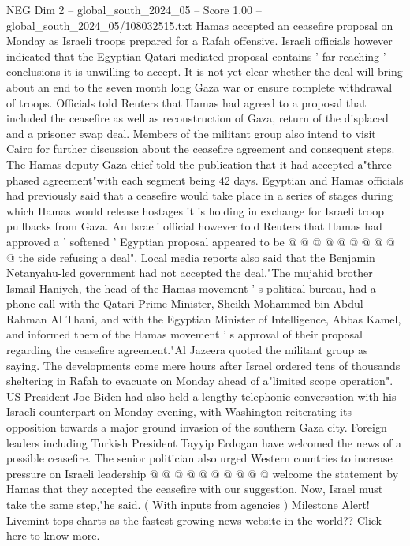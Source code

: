 \begin{textsample}{NEG Dim 2 – global\_south\_2024\_05 – Score 1.00 – global\_south\_2024\_05/108032515.txt}  \label{ex:f2_neg_216}
Hamas accepted an ceasefire proposal on Monday as Israeli troops prepared for a Rafah offensive.
Israeli officials however indicated that the Egyptian-Qatari mediated proposal contains ' far-reaching ' conclusions it is unwilling to accept.
It is not yet clear whether the deal will bring about an end to the seven month long Gaza war or ensure complete withdrawal of troops.
Officials told Reuters that Hamas had agreed to a proposal that included the ceasefire as well as reconstruction of Gaza, return of the displaced and a prisoner swap deal.
Members of the militant group also intend to visit Cairo for further discussion about the ceasefire agreement and consequent steps.
The Hamas deputy Gaza chief told the publication that it had accepted a"three phased agreement"with each segment being 42 days.
Egyptian and Hamas officials had previously said that a ceasefire would take place in a series of stages during which Hamas would release hostages it is holding in exchange for Israeli troop pullbacks from Gaza.
An Israeli official however told Reuters that Hamas had approved a ' softened ' Egyptian proposal appeared to be @ @ @ @ @ @ @ @ @ @ the side refusing a deal".
Local media reports also said that the Benjamin Netanyahu-led government had not accepted the deal."The mujahid brother Ismail Haniyeh, the head of the Hamas movement ' s political bureau, had a phone call with the Qatari Prime Minister, Sheikh Mohammed bin Abdul Rahman Al Thani, and with the Egyptian Minister of Intelligence, Abbas Kamel, and informed them of the Hamas movement ' s approval of their proposal regarding the ceasefire agreement."Al Jazeera quoted the militant group as saying.
The developments come mere hours after Israel ordered tens of thousands sheltering in Rafah to evacuate on Monday ahead of a"limited scope operation".
US President Joe Biden had also held a lengthy telephonic conversation with his Israeli counterpart on Monday evening, with Washington reiterating its opposition towards a major ground invasion of the southern Gaza city.
Foreign leaders including Turkish President Tayyip Erdogan have welcomed the news of a possible ceasefire.
The senior politician also urged Western countries to increase pressure on Israeli leadership @ @ @ @ @ @ @ @ @ @ welcome the statement by Hamas that they accepted the ceasefire with our suggestion.
Now, Israel must take the same step,"he said. ( With inputs from agencies ) Milestone Alert!
Livemint tops charts as the fastest growing news website in the world??
Click here to know more.

\end{textsample}

